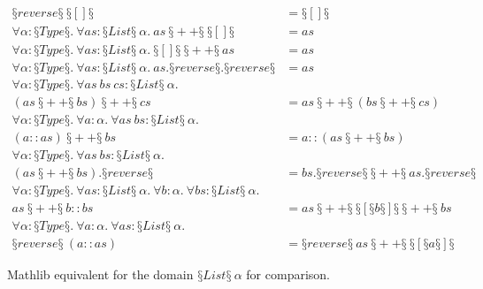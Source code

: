 \newpage

\begin{conjectureset}[H]
\begin{align}
§reverse§\ §[]§ &= §[]§ \label{overlappolymorphic:reverse_nil2}\\
\forall \alpha : §Type§.\ \forall as : §List§\ \alpha.\ as\ §++§\ §[]§ &= as \label{overlappolymorphic:append_nil2}\\
\forall \alpha : §Type§.\ \forall as : §List§\ \alpha.\ §[]§\ §++§\ as &= as \label{overlappolymorphic:nil_append2}\\
\forall \alpha : §Type§.\ \forall as : §List§\ \alpha.\ as.§reverse§.§reverse§ &= as \label{overlappolymorphic:reverse_reverse2}\\
\forall \alpha : §Type§.\ \forall as\ bs\ cs : §List§\ \alpha.\ \nonumber \\
  (as\ §++§\ bs)\ §++§\ cs &= as\ §++§\ (bs\ §++§\ cs) \label{overlappolymorphic:append_assoc2}\\
\forall \alpha : §Type§.\ \forall a : \alpha.\ \forall as\ bs : §List§\ \alpha.\ \nonumber \\
  (a::as)\ §++§\ bs &= a::(as\ §++§\ bs) \label{overlappolymorphic:cons_append2}\\
\forall \alpha : §Type§.\ \forall as\ bs : §List§\ \alpha.\ \nonumber \\
  (as\ §++§\ bs).§reverse§ &= bs.§reverse§\ §++§\ as.§reverse§ \label{overlappolymorphic:reverse_append2}\\
\forall \alpha : §Type§.\ \forall as : §List§\ \alpha.\ \forall b : \alpha.\ \forall bs : §List§\ \alpha.\ \nonumber \\
  as\ §++§\ b :: bs &= as\ §++§\ §[§b§]§\ §++§\ bs \label{overlappolymorphic:false_negative1}\\
\forall \alpha : §Type§.\ \forall a : \alpha.\ \forall as : §List§\ \alpha.\ \nonumber \\
  §reverse§\ (a :: as) &= §reverse§\ as\ §++§\ §[§a§]§ \label{overlappolymorphic:false_negative2}
\end{align}
\vspace{-0.9cm}
\caption{Mathlib equivalent for the domain $§List§\ \alpha$ for comparison.}\label{eqs:mathlib_polymorphic:compare}
\end{conjectureset}
